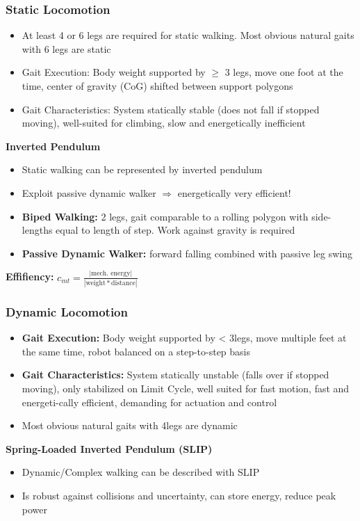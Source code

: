 \documentclass[fontsize=6pt]{scrartcl}
\begin{document}
\begin{multicols*}{4}
\subsubsection*{Static Locomotion}
\begin{itemize}
	\item At least 4 or 6 legs are required for static walking. Most obvious natural gaits
		  with 6 legs are static
	\item Gait Execution: Body weight supported by $\geq$ 3 legs, move one foot at the time,
		  center of gravity (CoG) shifted between support polygons
	\item Gait Characteristics: System statically stable (does not fall if stopped moving),
		  well-suited for climbing, slow and energetically inefficient
\end{itemize}
\textbf{Inverted Pendulum}
\begin{itemize}
	\item Static walking can be represented by inverted pendulum
	\item Exploit passive dynamic walker $\Rightarrow$ energetically very efficient!
	\item \textbf{Biped Walking:} 2 legs, gait comparable to a rolling polygon with
		  side-lengths equal to length of step. Work against gravity is required
	  \item \textbf{Passive Dynamic Walker:} forward falling combined with passive leg swing
\end{itemize}
\textbf{Effifiency:} $c_{mt} = \frac{|\text{mech. energy}|}{|\text{weight} * \text{distance}|}$

\subsubsection*{Dynamic Locomotion}
\begin{itemize}
	\item \textbf{Gait Execution:} Body weight supported by < 3legs, move multiple
		  feet at the same time, robot balanced on a step-to-step basis
	\item \textbf{Gait Characteristics:} System statically unstable (falls over if
		  stopped moving), only stabilized on Limit Cycle, well suited for fast motion,
		  fast and energeti-cally efficient, demanding for actuation and control
	\item Most obvious natural gaits with 4legs are dynamic
\end{itemize}
\textbf{Spring-Loaded Inverted Pendulum (SLIP)}
\begin{itemize}
	\item Dynamic/Complex walking can be described with SLIP
	\item Is robust against collisions and uncertainty, can store energy, reduce peak power
\end{itemize}


\end{multicols*}
\end{document}
